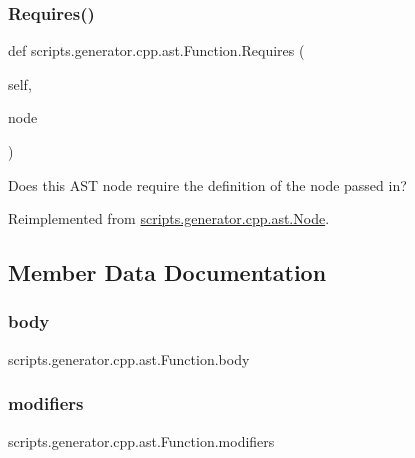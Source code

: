 \subsubsection{\texorpdfstring{Requires()}{Requires()}}
{\footnotesize\ttfamily def scripts.\+generator.\+cpp.\+ast.\+Function.\+Requires (\begin{DoxyParamCaption}\item[{}]{self,  }\item[{}]{node }\end{DoxyParamCaption})}

\begin{DoxyVerb}Does this AST node require the definition of the node passed in?\end{DoxyVerb}
 

Reimplemented from \mbox{\hyperlink{classscripts_1_1generator_1_1cpp_1_1ast_1_1_node_a37c4215d199947155270a485a3add21e}{scripts.\+generator.\+cpp.\+ast.\+Node}}.



\subsection{Member Data Documentation}
\mbox{\label{classscripts_1_1generator_1_1cpp_1_1ast_1_1_function_a7dbb61df4b5716e8f14d6547b8798a6a}} 
\subsubsection{\texorpdfstring{body}{body}}
{\footnotesize\ttfamily scripts.\+generator.\+cpp.\+ast.\+Function.\+body}

\mbox{\label{classscripts_1_1generator_1_1cpp_1_1ast_1_1_function_a2c3d4f1339ae74225cd691707abc669a}} 
\subsubsection{\texorpdfstring{modifiers}{modifiers}}
{\footnotesize\ttfamily scripts.\+generator.\+cpp.\+ast.\+Function.\+modifiers}

